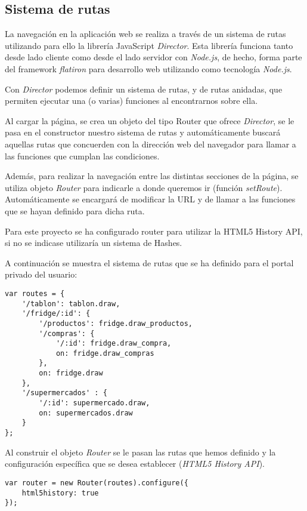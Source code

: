 \subsection{Sistema de rutas}

La navegación en la aplicación web se realiza a través de un sistema de rutas utilizando para ello la librería JavaScript \emph{Director}. Esta librería funciona tanto desde lado cliente como desde el lado servidor con \emph{Node.js}, de hecho, forma parte del framework \emph{flatiron} para desarrollo web utilizando como tecnología \emph{Node.js}.

Con \emph{Director} podemos definir un sistema de rutas, y de rutas anidadas, que permiten ejecutar una (o varias) funciones al encontrarnos sobre ella.

Al cargar la página, se crea un objeto del tipo Router que ofrece \emph{Director}, se le pasa en el constructor nuestro sistema de rutas y automáticamente buscará aquellas rutas que concuerden con la dirección web del navegador para llamar a las funciones que cumplan las condiciones.

Además, para realizar la navegación entre las distintas secciones de la página, se utiliza objeto \emph{Router} para indicarle a donde queremos ir (función \emph{setRoute}). Automáticamente se encargará de modificar la URL y de llamar a las funciones que se hayan definido para dicha ruta.

Para este proyecto se ha configurado router para utilizar la HTML5 History API, si no se indicase utilizaría un sistema de Hashes.

A continuación se muestra el sistema de rutas que se ha definido para el portal privado del usuario:

    \begin{lstlisting}
var routes = {
    '/tablon': tablon.draw,
    '/fridge/:id': {
        '/productos': fridge.draw_productos,
        '/compras': {
            '/:id': fridge.draw_compra,
            on: fridge.draw_compras
        },
        on: fridge.draw
    },
    '/supermercados' : {
        '/:id': supermercado.draw,
        on: supermercados.draw
    }
};
    \end{lstlisting}

Al construir el objeto \emph{Router} se le pasan las rutas que hemos definido y la configuración específica que se desea establecer (\emph{HTML5 History API}).

    \begin{lstlisting}
var router = new Router(routes).configure({
    html5history: true
});
    \end{lstlisting}


